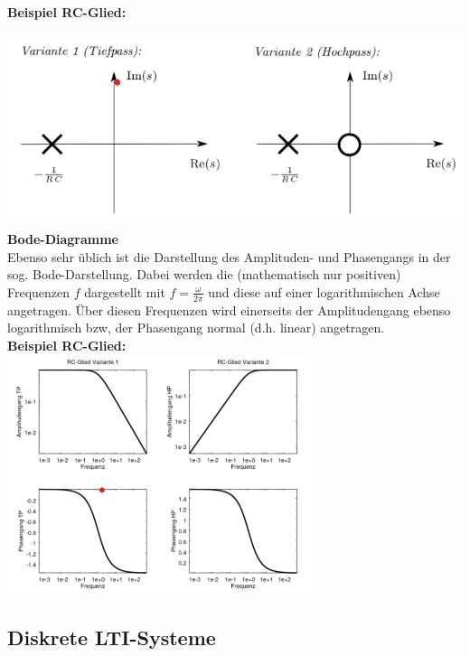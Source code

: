 \documentclass[12pt,a4paper]{scrartcl}
\begin{document}
  \noindent \textbf{Beispiel RC-Glied:}\\
  \includegraphics[height=6cm]{Pictures/PN.png} \\

  \noindent \textbf{Bode-Diagramme}\\
 \noindent  Ebenso sehr üblich ist die Darstellung des Amplituden- und Phasengangs in der sog. Bode-Darstellung. Dabei werden die (mathematisch nur positiven) Frequenzen $f$ dargestellt mit $f = \frac{\omega}{2\pi}$ und diese auf einer logarithmischen Achse angetragen. Über diesen Frequenzen wird einerseits der Amplitudengang ebenso logarithmisch bzw, der Phasengang normal (d.h. linear) angetragen. \\

  \noindent \textbf{Beispiel RC-Glied:}\\
  \includegraphics[height=7cm]{Pictures/Bode.png} \\





  \subsection{Diskrete LTI-Systeme}
  \label{sec:sub:diskrete-lti-systeme}
  
\end{document}
